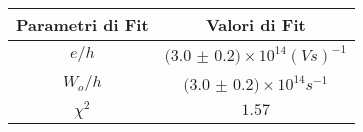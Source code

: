 \begin{tabular}{cc}
\hline
	Parametri di Fit & Valori di Fit\\ 
\hline
	$e/h$ & $(3.0$ $\pm$ $0.2)\times 10^{14}(Vs)^{-1}$ \\
	$W_o/h$ & $(3.0$ $\pm$ $0.2)\times 10^{14}s^{-1}$ \\
	$\chi^2$ & $1.57$ \\
\hline
\end{tabular}
